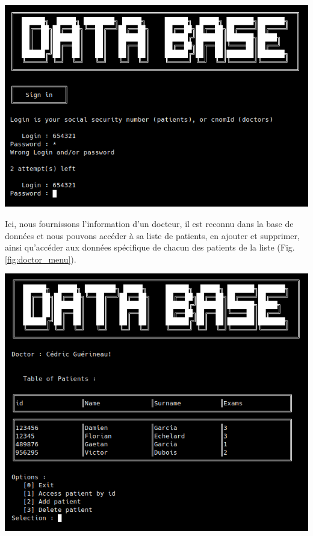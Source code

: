 \documentclass[12pt,a4paper]{article}
\newenvironment{Figure}
{\par\medskip\noindent\minipage{\linewidth}}
{\endminipage\par\medskip}
\begin{document}
\begin{multicols}{2}
		\begin{Figure}
			\centering
			\includegraphics[width=\linewidth]{images/walkthrough/sign_in.png}
			\label{fig:sign_in}
		\end{Figure}
		
		Ici, nous fournissons l'information d'un docteur, il est reconnu dans la base de données et nous pouvons accéder à sa liste de patients, en ajouter et supprimer, ainsi qu'accéder aux données spécifique de chacun des patients de la liste (Fig. \ref{fig:doctor_menu}). \\
		
		\begin{Figure}
			\centering
			\includegraphics[width=\linewidth]{images/walkthrough/doctor_main.png}
			\label{fig:doctor_menu}
		\end{Figure}
		

\end{multicols}
\end{document}
